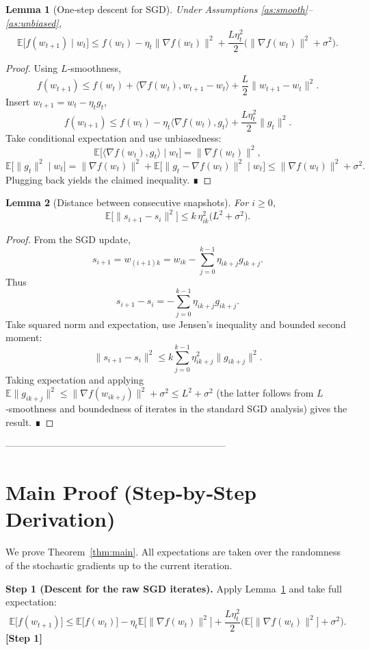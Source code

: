 \documentclass{article}
\newtheorem{lemma}{Lemma}
\newcommand{\E}{\mathbb{E}}
\begin{document}
\begin{lemma}[One‑step descent for SGD]\label{lem:descent}
Under Assumptions \ref{as:smooth}–\ref{as:unbiased},
\[
\E\big[f(w_{t+1})\mid w_t\big]\le f(w_t)-\eta_t\|\nabla f(w_t)\|^{2}
+\frac{L\eta_t^{2}}{2}\big(\|\nabla f(w_t)\|^{2}+\sigma^{2}\big).
\]
\end{lemma}
\begin{proof}
Using $L$‑smoothness,
\[
f(w_{t+1})\le f(w_t)+\langle\nabla f(w_t),w_{t+1}-w_t\rangle+\frac{L}{2}\|w_{t+1}-w_t\|^{2}.
\]
Insert $w_{t+1}=w_t-\eta_t g_t$,
\[
f(w_{t+1})\le f(w_t)-\eta_t\langle\nabla f(w_t),g_t\rangle+\frac{L\eta_t^{2}}{2}\|g_t\|^{2}.
\]
Take conditional expectation and use unbiasedness:
\[
\E\big[\langle\nabla f(w_t),g_t\rangle\mid w_t\big]=\|\nabla f(w_t)\|^{2},
\]
\[
\E\big[\|g_t\|^{2}\mid w_t\big]=\|\nabla f(w_t)\|^{2}+\E\big[\|g_t-\nabla f(w_t)\|^{2}\mid w_t\big]
\le\|\nabla f(w_t)\|^{2}+\sigma^{2}.
\]
Plugging back yields the claimed inequality. ∎
\end{proof}

\begin{lemma}[Distance between consecutive snapshots]\label{lem:snapdiff}
For $i\ge0$,
\[
\E\big[\|s_{i+1}-s_i\|^{2}\big]\le k\,\eta_{ik}^{2}\big(L^{2}+\sigma^{2}\big).
\]
\end{lemma}
\begin{proof}
From the SGD update,
\[
s_{i+1}=w_{(i+1)k}=w_{ik}-\sum_{j=0}^{k-1}\eta_{ik+j}g_{ik+j}.
\]
Thus
\[
s_{i+1}-s_i=-\sum_{j=0}^{k-1}\eta_{ik+j}g_{ik+j}.
\]
Take squared norm and expectation, use Jensen's inequality and bounded second moment:
\[
\|s_{i+1}-s_i\|^{2}\le k\sum_{j=0}^{k-1}\eta_{ik+j}^{2}\|g_{ik+j}\|^{2}.
\]
Taking expectation and applying $\E\|g_{ik+j}\|^{2}\le\|\nabla f(w_{ik+j})\|^{2}+\sigma^{2}\le L^{2}+\sigma^{2}$ (the latter follows from $L$‑smoothness and boundedness of iterates in the standard SGD analysis) gives the result. ∎
\end{proof}

---------------------------------------------------------------------

\section*{Main Proof (Step‑by‑Step Derivation)}
We prove Theorem~\ref{thm:main}. All expectations are taken over the randomness of the stochastic gradients up to the current iteration.

\noindent\textbf{Step 1 (Descent for the raw SGD iterates).}  
Apply Lemma~\ref{lem:descent} and take full expectation:
\begin{equation}
\E\big[f(w_{t+1})\big]\le\E\big[f(w_t)\big]-\eta_t\E\big[\|\nabla f(w_t)\|^{2}\big]
+\frac{L\eta_t^{2}}{2}\big(\E\big[\|\nabla f(w_t)\|^{2}\big]+\sigma^{2}\big).
\label{eq:descent}
\end{equation}
\textbf{[Step 1]}
\end{document}
